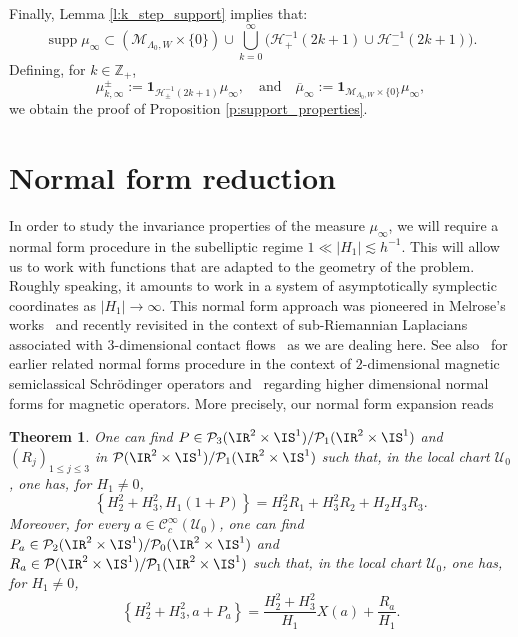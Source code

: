 \documentclass[JEP,XML,SOM,Unicode, NoEqCountersInSection,published]{cedram}
\theoremstyle{plain}
\newtheorem{theo}{Theorem}[section]
\theoremstyle{definition}
\theoremstyle{remark}
\begin{document}
Finally, Lemma \ref{l:k_step_support} implies that:
\[
\operatorname{supp}\mu_\infty\subset (\mathcal{M}_{\Lambda_0,W} \times \{ 0 \}) \cup \bigcup_{k=0}^\infty \bigl(\mathcal{H}_+^{-1}(2k+1) \cup \mathcal{H}_-^{-1}(2k+1) \bigr).
\]
Defining, for $k \in \mathbb{Z}_+$,
\[
\mu_{k,\infty}^\pm := \mathbf{1}_{\mathcal{H}_\pm^{-1}(2k+1)} \mu_\infty,\quad \text{and}\quad \overline{\mu}_\infty := \mathbf{1}_{\mathcal{M}_{\Lambda_0,W} \times \{0 \}} \mu_\infty,
\]
we obtain the proof of Proposition \ref{p:support_properties}.

\section{Normal form reduction}\label{s:normalform}

In order to study the invariance properties of the measure $\mu_\infty$, we will require a normal form procedure in the subelliptic regime $1 \ll |H_1| \lesssim h^{-1}$. This will allow us to work with functions that are adapted to the geometry of the problem. Roughly speaking, it amounts to work in a system of asymptotically symplectic coordinates as $|H_1|\to \infty$. This normal form approach was pioneered in Melrose's works~\cite{Melrose85} and recently revisited in the context of sub-Riemannian Laplacians associated with $3$-dimensional contact flows~\cite{ColindeVerdiereHillairetTrelat15, ColindeVerdiereHillairetTrelat21} as we are dealing here. See also~\cite{ RaymondVuNgoc15} for earlier related normal forms procedure in the context of $2$-dimensional magnetic semiclassical Schrödinger operators and~\cite{HelfferKordyukovRaymondVuNgoc16, Morin19, Morin20} regarding higher dimensional normal forms for magnetic operators. More precisely, our normal form expansion reads

\begin{theo}\label{t:normalform} One can find $P\in\mathcal{P}_3(\IR^2\times\IS^1)/\mathcal{P}_1(\IR^2\times\IS^1)$ and $(R_j)_{1\leq j\leq 3}$ in \hbox{$\mathcal{P}(\IR^2\times\IS^1)/\mathcal{P}_1(\IR^2\times\IS^1)$} such that, in the local chart $\mathcal{U}_0$, one has, for $H_1\neq 0$,
\[
\left\{H_2^2+H_3^2,H_1(1+P)\right\}=H_2^2R_1+H_3^2R_2+H_2H_3R_3.
\]
Moreover, for every $a\in\mathcal{C}^\infty_c(\mathcal{U}_0)$, one can find $P_a\in \mathcal{P}_2(\IR^2\times\IS^1)/\mathcal{P}_0(\IR^2\times\IS^1)$ and $R_a\in\mathcal{P}(\IR^2\times\IS^1)/\mathcal{P}_1(\IR^2\times\IS^1)$ such that, in the local chart $\mathcal{U}_0$, one has, for $H_1\neq 0$,
\[
\left\{H_2^2+H_3^2,a+P_a\right\}=\frac{H_2^2+H_3^2}{H_1}X(a)+\frac{R_a}{H_1}.
\]
\end{theo}
\end{document}
